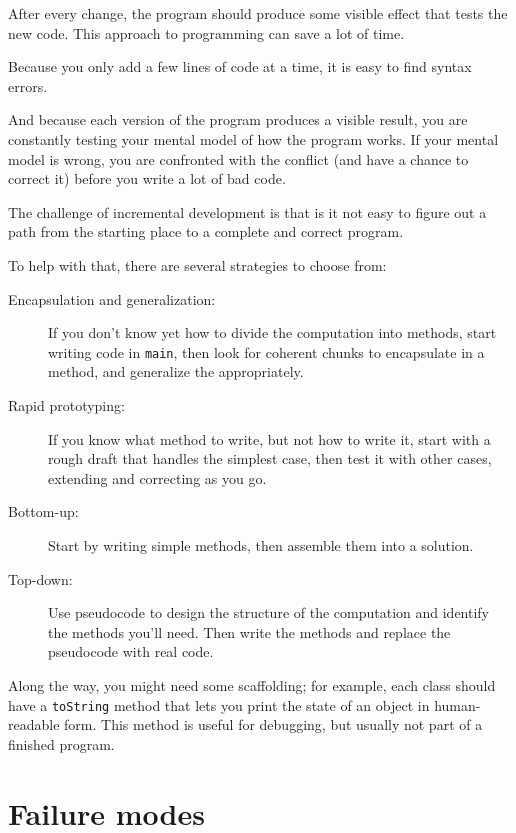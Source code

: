 \documentclass[12pt]{book}
\theoremstyle{definition}
\begin{document}
After every change, the program should produce some visible effect
that tests the new code.  This approach to programming can save
a lot of time.

Because you only add a few lines of code at a time, it
is easy to find syntax errors.  

And because each version of the
program produces a visible result, you are constantly testing your
mental model of how the program works.  If your mental model is
wrong, you are confronted with the conflict (and have a chance
to correct it) before you write a lot of bad code.

The challenge of incremental development is that is it not
easy to figure out a path from the starting place
to a complete and correct program.

To help with that, there are several strategies to choose from:

\begin{description}

\item[Encapsulation and generalization:] If you don't know yet how
to divide the computation into methods, start writing code in
{\tt main}, then look for coherent chunks to encapsulate in
a method, and generalize the appropriately.

\item[Rapid prototyping:] If you know what method to write, but not
how to write it, start with a rough draft that handles the simplest
case, then test it with other cases, extending and correcting as you go.

\item[Bottom-up:] Start by writing simple methods, then assemble them
into a solution.

\item[Top-down:] Use pseudocode to design the structure of the
computation and identify the methods you'll need.  Then write the
methods and replace the pseudocode with real code.

\end{description}

Along the way, you might need some scaffolding; for example, each
class should have a {\tt toString} method that lets you print the
state of an object in human-readable form.  This method is useful
for debugging, but usually not part of a finished program.

\section{Failure modes}
\end{document}
